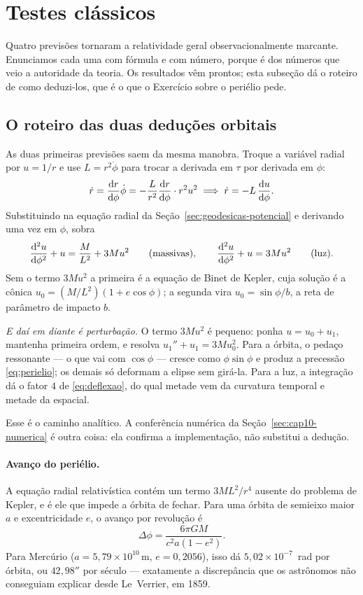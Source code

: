 \documentclass[12pt,a4paper,oneside]{book}
\theoremstyle{rgplain}
\theoremstyle{rgremark}
\begin{document}
\section{Testes clássicos}
\label{sec:testes-classicos}

Quatro previsões tornaram a relatividade geral observacionalmente marcante.
Enunciamos cada uma com fórmula e com número, porque é dos números que veio a
autoridade da teoria. Os resultados vêm prontos; esta subseção dá o roteiro
de como deduzi-los, que é o que o Exercício sobre o periélio pede.

\subsection*{O roteiro das duas deduções orbitais}

As duas primeiras previsões saem da mesma manobra. Troque a variável radial
por $u=1/r$ e use $L=r^2\dot\phi$ para trocar a derivada em $\tau$ por
derivada em $\phi$:
\[
  \dot r=\frac{\mathrm{d} r}{\mathrm{d} \phi}\dot\phi=-\frac{L}{r^2}\frac{\mathrm{d} r}{\mathrm{d} \phi}\cdot r^2 u^2
  \;\Longrightarrow\;
  \dot r=-L\,\frac{\mathrm{d} u}{\mathrm{d} \phi} .
\]
Substituindo na equação radial da Seção~\ref{sec:geodesicas-potencial} e
derivando uma vez em $\phi$, sobra
\begin{equation}
  \frac{\mathrm{d} ^2u}{\mathrm{d} \phi^2}+u=\frac{M}{L^2}+3Mu^2
  \qquad\text{(massivas)} ,
  \qquad
  \frac{\mathrm{d} ^2u}{\mathrm{d} \phi^2}+u=3Mu^2
  \qquad\text{(luz)} .
  \label{eq:binet-relativistica}
\end{equation}
Sem o termo $3Mu^2$ a primeira é a equação de Binet de Kepler, cuja solução é
a cônica $u_0=(M/L^2)(1+e\cos\phi)$; a segunda vira $u_0=\sin\phi/b$, a reta
de parâmetro de impacto $b$.

\emph{E daí em diante é perturbação.} O termo $3Mu^2$ é pequeno: ponha
$u=u_0+u_1$, mantenha primeira ordem, e resolva
$u_1''+u_1=3Mu_0^2$. Para a órbita, o pedaço ressonante --- o que vai com
$\cos\phi$ --- cresce como $\phi\sin\phi$ e produz a precessão
\eqref{eq:perielio}; os demais só deformam a elipse sem girá-la. Para a luz, a
integração dá o fator $4$ de \eqref{eq:deflexao}, do qual metade vem da
curvatura temporal e metade da espacial.

Esse é o caminho analítico. A conferência numérica da
Seção~\ref{sec:cap10-numerica} é outra coisa: ela confirma a implementação,
não substitui a dedução.

\paragraph{Avanço do periélio.} A equação radial relativística contém um termo
$3ML^2/r^4$ ausente do problema de Kepler, e é ele que impede a órbita de
fechar. Para uma órbita de semieixo maior $a$ e excentricidade $e$, o avanço
por revolução é
\begin{equation}
  \Delta\phi=\frac{6\pi GM}{c^2a(1-e^2)} .
  \label{eq:perielio}
\end{equation}
Para Mercúrio ($a=5{,}79\times10^{10}\,$m, $e=0{,}2056$), isso dá
$5{,}02\times10^{-7}$~rad por órbita, ou $42{,}98''$ por século --- exatamente
a discrepância que os astrônomos não conseguiam explicar desde Le~Verrier,
em 1859.
\end{document}
